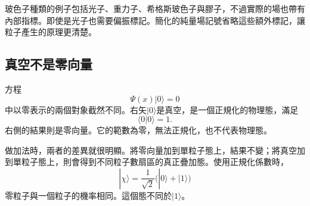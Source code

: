 \begin{classroomqa}
\end{classroomqa}

玻色子種類的例子包括光子、重力子、希格斯玻色子與膠子，不過實際的場也帶有內部指標。即使是光子也需要偏振標記。簡化的純量場記號省略這些額外標記，讓粒子產生的原理更清楚。

\subsection{真空不是零向量}

方程
\begin{equation}
\Psi(x)|0\rangle=0
\end{equation}
中以零表示的兩個對象截然不同。右矢\(|0\rangle\)是真空，是一個正規化的物理態，滿足
\begin{equation}
\langle0|0\rangle=1.
\end{equation}
右側的結果則是零向量。它的範數為零，無法正規化，也不代表物理態。

做加法時，兩者的差異就很明顯。將零向量加到單粒子態上，結果不變；將真空加到單粒子態上，則會得到不同粒子數扇區的真正疊加態。使用正規化係數時，
\begin{equation}
|\chi\rangle=\frac{1}{\sqrt2}\bigl(|0\rangle+|1\rangle\bigr)
\end{equation}
零粒子與一個粒子的機率相同。這個態不同於\(|1\rangle\)。

\begin{classroomqa}
\end{classroomqa}

\begin{classroomqa}
\end{classroomqa}

